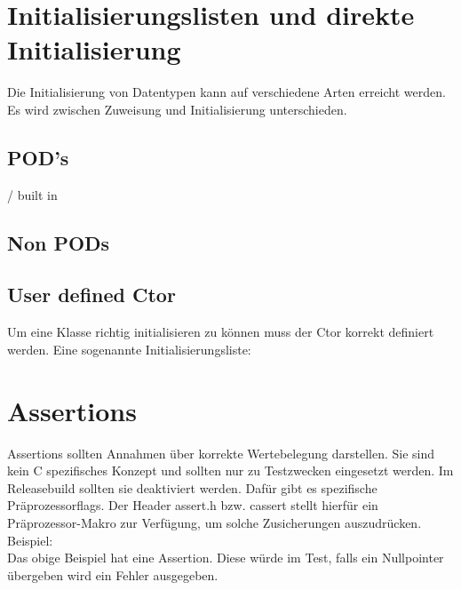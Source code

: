

\section{Initialisierungslisten und direkte Initialisierung}

Die Initialisierung von Datentypen kann auf verschiedene Arten erreicht werden. 
Es wird zwischen Zuweisung und Initialisierung unterschieden.

\subsection{POD's}

 / built in 



\subsection{Non PODs}



\subsection{User defined Ctor}

Um eine Klasse richtig initialisieren zu können muss der Ctor korrekt definiert werden. 
Eine sogenannte Initialisierungsliste:



\section{Assertions}

Assertions sollten Annahmen über korrekte Wertebelegung darstellen. 
Sie sind kein C spezifisches Konzept und sollten nur zu Testzwecken eingesetzt werden. 
Im Releasebuild sollten sie deaktiviert werden. 
Dafür gibt es spezifische Präprozessorflags.
Der Header assert.h bzw. cassert stellt hierfür ein Präprozessor-Makro  zur Verfügung, um solche Zusicherungen auszudrücken.\\
Beispiel:\\



Das obige Beispiel hat eine Assertion. 
Diese würde im Test, falls ein Nullpointer übergeben wird ein Fehler ausgegeben. 

